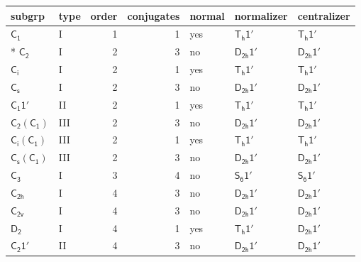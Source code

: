 \documentclass[10pt,a4paper]{article}
\numberwithin{equation}{section}
\newcommand{\grp}[1]{\mathsf{#1}}
\begin{document}
{\small\begin{longtable}{@{}llrrlll@{}}\toprule
subgrp & type & order & conjugates & normal & normalizer & centralizer\\\midrule\endhead
\bottomrule\endfoot\endlastfoot
\href{../../../rotation/data/pdf/C1.pdf}{$\grp{C_{1}}$} & I & 1 & 1 & yes & \href{Th-1p.pdf}{$\grp{T_{h}1'}$} & \href{Th-1p.pdf}{$\grp{T_{h}1'}$}\\*
\href{../../../rotation/data/pdf/C2.pdf}{$\grp{C_{2}}$} & I & 2 & 3 & no & \href{D2h-1p.pdf}{$\grp{D_{2h}1'}$} & \href{D2h-1p.pdf}{$\grp{D_{2h}1'}$}\\
\href{../../../rotation/data/pdf/S2.pdf}{$\grp{C_{i}}$} & I & 2 & 1 & yes & \href{Th-1p.pdf}{$\grp{T_{h}1'}$} & \href{Th-1p.pdf}{$\grp{T_{h}1'}$}\\
\href{../../../rotation/data/pdf/C1v.pdf}{$\grp{C_{s}}$} & I & 2 & 3 & no & \href{D2h-1p.pdf}{$\grp{D_{2h}1'}$} & \href{D2h-1p.pdf}{$\grp{D_{2h}1'}$}\\
\href{C1-1p.pdf}{$\grp{C_{1}1'}$} & II & 2 & 1 & yes & \href{Th-1p.pdf}{$\grp{T_{h}1'}$} & \href{Th-1p.pdf}{$\grp{T_{h}1'}$}\\
\href{C2-C1.pdf}{$\grp{C_{2}}(\grp{C_{1}})$} & III & 2 & 3 & no & \href{D2h-1p.pdf}{$\grp{D_{2h}1'}$} & \href{D2h-1p.pdf}{$\grp{D_{2h}1'}$}\\
\href{S2-C1.pdf}{$\grp{C_{i}}(\grp{C_{1}})$} & III & 2 & 1 & yes & \href{Th-1p.pdf}{$\grp{T_{h}1'}$} & \href{Th-1p.pdf}{$\grp{T_{h}1'}$}\\
\href{C1v-C1.pdf}{$\grp{C_{s}}(\grp{C_{1}})$} & III & 2 & 3 & no & \href{D2h-1p.pdf}{$\grp{D_{2h}1'}$} & \href{D2h-1p.pdf}{$\grp{D_{2h}1'}$}\\
\href{../../../rotation/data/pdf/C3.pdf}{$\grp{C_{3}}$} & I & 3 & 4 & no & \href{S6-1p.pdf}{$\grp{S_{6}1'}$} & \href{S6-1p.pdf}{$\grp{S_{6}1'}$}\\
\href{../../../rotation/data/pdf/C2h.pdf}{$\grp{C_{2h}}$} & I & 4 & 3 & no & \href{D2h-1p.pdf}{$\grp{D_{2h}1'}$} & \href{D2h-1p.pdf}{$\grp{D_{2h}1'}$}\\
\href{../../../rotation/data/pdf/C2v.pdf}{$\grp{C_{2v}}$} & I & 4 & 3 & no & \href{D2h-1p.pdf}{$\grp{D_{2h}1'}$} & \href{D2h-1p.pdf}{$\grp{D_{2h}1'}$}\\
\href{../../../rotation/data/pdf/D2.pdf}{$\grp{D_{2}}$} & I & 4 & 1 & yes & \href{Th-1p.pdf}{$\grp{T_{h}1'}$} & \href{D2h-1p.pdf}{$\grp{D_{2h}1'}$}\\
\href{C2-1p.pdf}{$\grp{C_{2}1'}$} & II & 4 & 3 & no & \href{D2h-1p.pdf}{$\grp{D_{2h}1'}$} & \href{D2h-1p.pdf}{$\grp{D_{2h}1'}$}\\

\end{longtable}}
\end{document}
